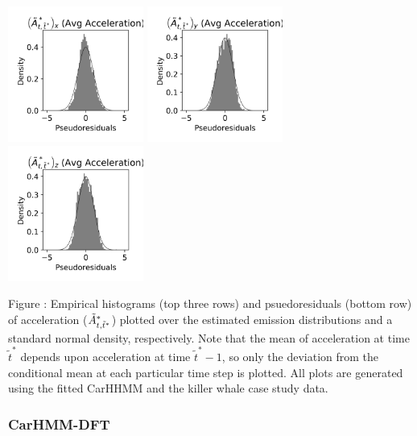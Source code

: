 \documentclass{article}
\begin{document}
\begin{center}
        \includegraphics[width=1.75in]{../Plots/CarHHMM1_psedoresids_Ax.png}
        \includegraphics[width=1.75in]{../Plots/CarHHMM1_psedoresids_Ay.png}
        \includegraphics[width=1.75in]{../Plots/CarHHMM1_psedoresids_Az.png}
        \end{center}
        
        \noindent Figure : Empirical histograms (top three rows) and psuedoresiduals (bottom row) of acceleration ($\tilde{A}^*_{t,\tilde t^*}$) plotted over the estimated emission distributions and a standard normal density, respectively. Note that the mean of acceleration at time $\tilde t^*$ depends upon acceleration at time $\tilde t^*-1$, so only the deviation from the conditional mean at each particular time step is plotted. All plots are generated using the fitted CarHHMM and the killer whale case study data.
        \addtocounter{fignum}{1}
        
        \newpage
        
        \subsubsection{CarHMM-DFT}
        
\end{document}
